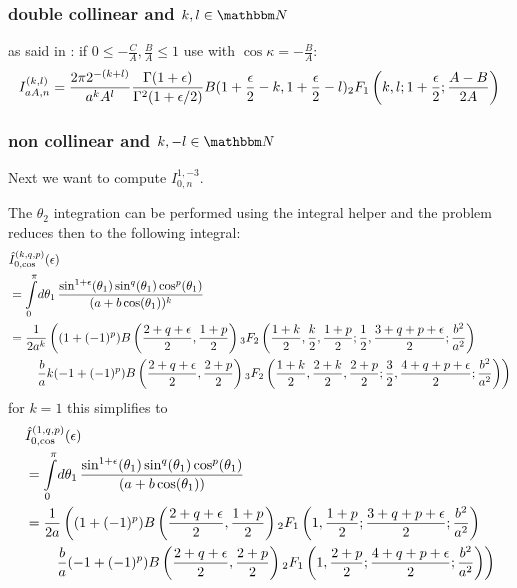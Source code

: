 \documentclass[
  english,		%
  a4paper,		%
  11pt,			%
  DIV=12,
  titlepage,
  toc=bibnumbered,
  parskip=full,  	%
  headings=normal,
  BCOR=12mm,
  numbers=noenddot
]{scrartcl}
\begin{document}
\subsubsection{double collinear and $k,l\in\mathbbm N$}
as said in \cite[Ch. 5]{Bojak:2000eu}: if $0\leq -\frac{C}{A},\frac B A \leq 1$ use \cite[eq. A11]{van_neerven_dimensional_1986} with $\cos\kappa = -\frac B A$:
\begin{equation}
I_{aA,n}^{(k,l)} = \frac{2\pi 2^{-(k+l)}}{a^kA^l}\frac{\Gamma(1+\epsilon)}{\Gamma^2(1+\epsilon/2)} B(1+\frac \epsilon 2 - k, 1+ \frac \epsilon 2 -l) {}_{2}F_{1} \left(k,l;1+\frac \epsilon 2; \frac{A-B}{2A}\right)
\end{equation}

\subsubsection{non collinear and $k,-l\in\mathbbm N$}
Next we want to compute $I_{0,n}^{1,-3}$.

The $\theta_2$ integration can be performed using the integral helper and the problem reduces then to the following integral:
\begin{align}
&\hat I_{0,\cos}^{(k,q,p)}(\epsilon) \nonumber\\
&= \int\limits_0^\pi\!d\theta_1\, \frac{\sin^{1+\epsilon}(\theta_1)\sin^q(\theta_1) \cos^p(\theta_1)}{(a+b\cos(\theta_1))^k}\\
&= \frac 1 {2a^k}\left((1+(-1)^p)B\left(\frac{2+q+\epsilon}{2},\frac{1+p}{2}\right){}_{3}F_{2} \left(\frac{1+k}{2},\frac k 2,\frac{1+p}{2};\frac{1}{2},\frac{3+q+p+\epsilon}{2};\frac{b^2}{a^2}\right)\right.\nonumber\\
 &\hspace{20pt}\left. \frac b a k(-1+(-1)^p)B\left(\frac{2+q+\epsilon}{2},\frac{2+p}{2}\right){}_{3}F_{2}\left(\frac{1+k} 2,\frac{2+k}{2},\frac{2+p}{2};\frac{3}{2},\frac{4+q+p+\epsilon}{2};\frac{b^2}{a^2}\right) \right)
\end{align}
for $k=1$ this simplifies to
\begin{align}
&\hat I_{0,\cos}^{(1,q,p)}(\epsilon) \nonumber\\
&= \int\limits_0^\pi\!d\theta_1\, \frac{\sin^{1+\epsilon}(\theta_1)\sin^q(\theta_1) \cos^p(\theta_1)}{(a+b\cos(\theta_1))}\\
&= \frac 1 {2a}\left((1+(-1)^p)B\left(\frac{2+q+\epsilon}{2},\frac{1+p}{2}\right){}_{2}F_{1} \left(1,\frac{1+p}{2};\frac{3+q+p+\epsilon}{2};\frac{b^2}{a^2}\right)\right.\nonumber\\
 &\hspace{20pt}\left. \frac b a (-1+(-1)^p)B\left(\frac{2+q+\epsilon}{2},\frac{2+p}{2}\right){}_{2}F_{1}\left(1,\frac{2+p}{2};\frac{4+q+p+\epsilon}{2};\frac{b^2}{a^2}\right) \right)
\end{align}

\appendix


\listoffixmes
\end{document}

